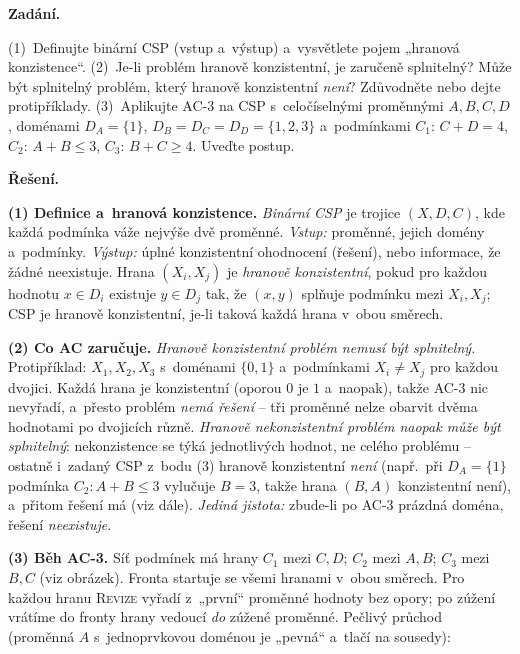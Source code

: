 \begin{priklad}
\par
\textbf{Zadání.}\par
(1)~Definujte binární CSP (vstup a~výstup) a~vysvětlete pojem „hranová konzistence``. (2)~Je-li problém hranově konzistentní, je zaručeně splnitelný? Může být splnitelný problém, který hranově konzistentní \emph{není}? Zdůvodněte nebo dejte protipříklady. (3)~Aplikujte AC-3 na CSP s~celočíselnými proměnnými $A,B,C,D$, doménami $D_A=\{1\}$, $D_B=D_C=D_D=\{1,2,3\}$ a~podmínkami $C_1\!:\,C+D=4$, $C_2\!:\,A+B\le 3$, $C_3\!:\,B+C\ge 4$. Uveďte postup.

\medskip
\textbf{Řešení.}

\textbf{(1) Definice a~hranová konzistence.} \emph{Binární CSP} je trojice $(X,D,C)$, kde každá podmínka váže nejvýše dvě proměnné. \emph{Vstup:} proměnné, jejich domény a~podmínky. \emph{Výstup:} úplné konzistentní ohodnocení (řešení), nebo informace, že žádné neexistuje. Hrana $(X_i,X_j)$ je \emph{hranově konzistentní}, pokud pro každou hodnotu $x\in D_i$ existuje $y\in D_j$ tak, že $(x,y)$ splňuje podmínku mezi $X_i,X_j$; CSP je hranově konzistentní, je-li taková každá hrana v~obou směrech.

\textbf{(2) Co AC zaručuje.} \emph{Hranově konzistentní problém nemusí být splnitelný.} Protipříklad: $X_1,X_2,X_3$ s~doménami $\{0,1\}$ a~podmínkami $X_i\neq X_j$ pro každou dvojici. Každá hrana je konzistentní (oporou $0$ je $1$ a~naopak), takže AC-3 nic nevyřadí, a~přesto problém \emph{nemá řešení} -- tři proměnné nelze obarvit dvěma hodnotami po dvojicích různě. \emph{Hranově nekonzistentní problém naopak může být splnitelný}: nekonzistence se týká jednotlivých hodnot, ne celého problému -- ostatně i~zadaný CSP z~bodu (3) hranově konzistentní \emph{není} (např.\ při $D_A=\{1\}$ podmínka $C_2\!:A+B\le3$ vylučuje $B=3$, takže hrana $(B,A)$ konzistentní není), a~přitom řešení má (viz dále). \emph{Jediná jistota:} zbude-li po AC-3 prázdná doména, řešení \emph{neexistuje}.

\textbf{(3) Běh AC-3.} Síť podmínek má hrany $C_1$ mezi $C,D$; $C_2$ mezi $A,B$; $C_3$ mezi $B,C$ (viz obrázek). Fronta startuje se všemi hranami v~obou směrech. Pro každou hranu \textsc{Revize} vyřadí z~„první`` proměnné hodnoty bez opory; po zúžení vrátíme do fronty hrany vedoucí \emph{do} zúžené proměnné. Pečlivý průchod (proměnná $A$ s~jednoprvkovou doménou je „pevná`` a~tlačí na sousedy):


\end{priklad}

